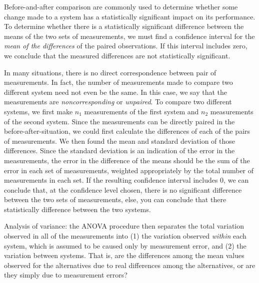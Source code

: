 \documentclass[openany, a4paper]{book}
\theoremstyle{plain}
\theoremstyle{definition}
\theoremstyle{remark}
\begin{document}
Before-and-after comparison are commonly used to determine whether some
change made to a system has a statistically significant impact on its
performance. To determine whether there is a statistically significant
difference between the means of the two sets of measurements, we must find a
confidence interval for the \emph{mean of the differences} of the paired
observations. If this interval includes zero, we conclude that the measured
differences are not statistically significant.

In many situations, there is no direct correspondence between pair of
measurements. In fact, the number of measurements made to compare two
different system need not even be the same. In this case, we say that the
measurements are \emph{noncorresponding} or \emph{unpaired}.
To compare two different systems, we first make \(n_1\) measurements of the
first system and \(n_2\) measurements of the second system. Since the
measurements can be directly paired in the before-after-situation, we could
first calculate the differences of each of the pairs of measurements. We
then found the mean and standard deviation of those differences. Since the
standard deviation is an indication of the error in the measurements, the
error in the difference of the means should be the sum of the error in each
set of measurements, weighted appropriately by the total number of
measurements in each set. If the resulting confidence interval includes 0,
we can conclude that, at the confidence level chosen, there is no
significant difference between the two sets of measurements, else, you can
conclude that there statistically difference between the two systems.

Analysis of variance: the ANOVA procedure then separates the total variation
observed in all of the measurements into (1) the variation observed \emph{within}
each system, which is assumed to be caused only by measurement error, and
(2) the variation between systems. That is, are the differences among the
mean values observed for the alternatives due to real differences among the
alternatives, or are they simply due to measurement errors?
\end{document}
